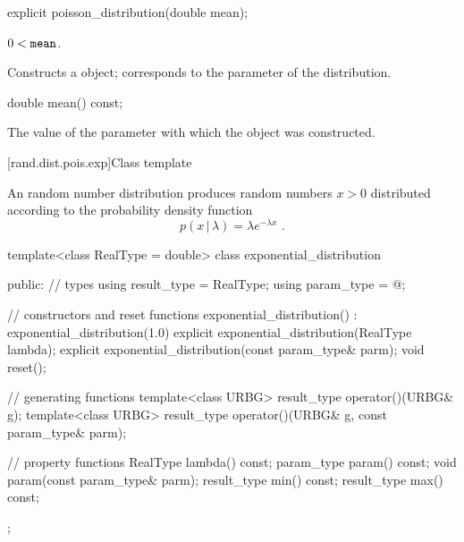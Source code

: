 %
\begin{itemdecl}
explicit poisson_distribution(double mean);
\end{itemdecl}

\begin{itemdescr}
\pnum
\requires $0 < \texttt{mean}$.

\pnum
\effects Constructs a  object;
 corresponds to the parameter of the distribution.
\end{itemdescr}

%
\begin{itemdecl}
double mean() const;
\end{itemdecl}

\begin{itemdescr}
\pnum\returns The value of the  parameter
 with which the object was constructed.
\end{itemdescr}


[rand.dist.pois.exp]{Class template }%
%
%

\pnum
An  random number distribution
produces random numbers $x > 0$
distributed according to
the probability density function%
%
%
\[ p(x\,|\,\lambda) = \lambda e^{-\lambda x} \text{ .} \]

%
\begin{codeblock}
template<class RealType = double>
  class exponential_distribution {
  public:
    // types
    using result_type = RealType;
    using param_type  = @\unspec@;

    // constructors and reset functions
    exponential_distribution() : exponential_distribution(1.0) {}
    explicit exponential_distribution(RealType lambda);
    explicit exponential_distribution(const param_type& parm);
    void reset();

    // generating functions
    template<class URBG>
      result_type operator()(URBG& g);
    template<class URBG>
      result_type operator()(URBG& g, const param_type& parm);

    // property functions
    RealType lambda() const;
    param_type param() const;
    void param(const param_type& parm);
    result_type min() const;
    result_type max() const;
  };
\end{codeblock}


